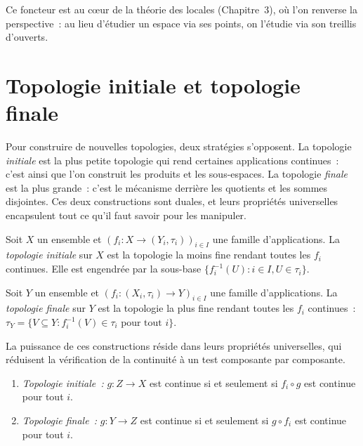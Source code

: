 \begin{remarque}
Ce foncteur est au c\oe ur de la th\'eorie des locales (Chapitre~3), o\`u l'on renverse
la perspective~: au lieu d'\'etudier un espace via ses points, on l'\'etudie via son treillis
d'ouverts.
\end{remarque}

\section{Topologie initiale et topologie finale}

Pour construire de nouvelles topologies, deux strat\'egies s'opposent. La
topologie \emph{initiale} est la plus petite topologie qui rend certaines
applications continues~: c'est ainsi que l'on construit les produits et les
sous-espaces. La topologie \emph{finale} est la plus grande~: c'est le
m\'ecanisme derri\`ere les quotients et les sommes disjointes. Ces deux
constructions sont duales, et leurs propri\'et\'es universelles encapsulent
tout ce qu'il faut savoir pour les manipuler.

\begin{definition}
Soit $X$ un ensemble et $(f_i\colon X \to (Y_i,\tau_i))_{i\in I}$ une famille
d'applications. La \emph{topologie initiale} sur $X$ est la topologie la moins fine
rendant toutes les $f_i$ continues. Elle est engendr\'ee par la sous-base
$\{f_i^{-1}(U) : i \in I, U \in \tau_i\}$.
\end{definition}

\begin{definition}
Soit $Y$ un ensemble et $(f_i\colon (X_i,\tau_i) \to Y)_{i\in I}$ une famille
d'applications. La \emph{topologie finale} sur $Y$ est la topologie la plus fine
rendant toutes les $f_i$ continues~:
$\tau_Y = \{V \subseteq Y : f_i^{-1}(V) \in \tau_i \text{ pour tout } i\}$.
\end{definition}

La puissance de ces constructions r\'eside dans leurs propri\'et\'es
universelles, qui r\'eduisent la v\'erification de la continuit\'e \`a un test
composante par composante.

\begin{theoreme}
\begin{enumerate}
  \item \emph{Topologie initiale~:} $g\colon Z \to X$ est continue si et seulement si
    $f_i \circ g$ est continue pour tout $i$.
  \item \emph{Topologie finale~:} $g\colon Y \to Z$ est continue si et seulement si
    $g \circ f_i$ est continue pour tout $i$.
\end{enumerate}
\end{theoreme}

